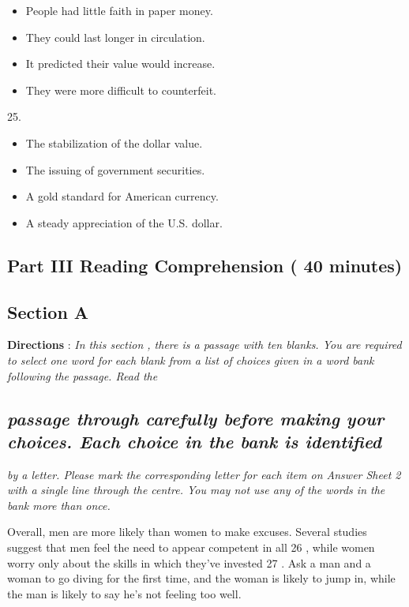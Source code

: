 \documentclass[UTF8,11pt]{ctexart}
\begin{document}
\begin{itemize}[leftmargin=2em,itemsep=.2em,topsep=.4em]\item[A.] People had little faith in paper money.
\item[B.] They could last longer in circulation.
\item[C.] It predicted their value would increase.
\item[D.] They were more difficult to counterfeit.
\end{itemize}

25.


\begin{itemize}[leftmargin=2em,itemsep=.2em,topsep=.4em]\item[A.] The stabilization of the dollar value.
\item[B.] The issuing of government securities.
\item[C.] A gold standard for American currency.
\item[D.] A steady appreciation of the U.S. dollar.
\end{itemize}

\subsection*{\textbf{Part III} \textbf{Reading Comprehension} \textbf{( 40 minutes)}}


\subsection*{\textbf{Section A}}


\textbf{Directions }: \textit{In this section , there is a passage with ten blanks. You are required to select one word for} \textit{each blank from a list of choices given in a word bank following the passage. Read the}


\subsection*{\textit{passage through carefully before making your choices. Each choice in the bank is identified}}


\textit{by a letter. Please mark the corresponding letter for each item on Answer Sheet 2 with a} \textit{single line through the centre. You may not use any of the words in the bank more than once.}


Overall, men are more likely than women to make excuses. Several studies suggest that men feel the need to appear competent in all 26 , while women worry only about the skills in which they've invested 27 . Ask a man and a woman to go diving for the first time, and the woman is likely to jump in, while the man is likely to say he's not feeling too well.
\end{document}
